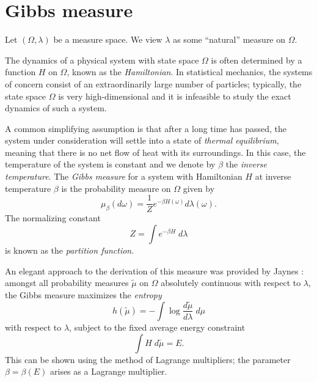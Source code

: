
\section{Gibbs measure}

Let $(\Omega, \lambda)$ be a measure space. We view $\lambda$ as some ``natural''
measure on $\Omega$.

The dynamics of a physical system with state space $\Omega$
is often determined by a function $H$ on $\Omega$, known as the \emph{Hamiltonian}.
In statistical mechanics, the systems of concern consist of an extraordinarily
large number of particles; typically, the state space $\Omega$ is very
high-dimensional and it is infeasible to study the exact dynamics of such a
system.

A common simplifying assumption is that after a long time has passed, the system
under consideration will settle into a state of \emph{thermal equilibrium}, meaning
that there is no net flow of heat with its surroundings. In this case, the temperature
of the system is constant and we denote by $\beta$ the \emph{inverse temperature}.
The \emph{Gibbs measure} for a system with Hamiltonian $H$ at inverse temperature
$\beta$ is the probability measure on $\Omega$ given by
\begin{equation}
\label{e:gibbs-def}
\mu_\beta(d\omega) = \frac{1}{Z} e^{-\beta H(\omega)} d\lambda(\omega).
\end{equation}
The normalizing constant
\begin{equation}
Z = \int e^{-\beta H} \; d\lambda
\end{equation}
is known as the \emph{partition function}.

An elegant approach to the derivation of this measure was provided by Jaynes
\cite{Jaynes57}: amongst all probability measures $\tilde\mu$ on $\Omega$ absolutely
continuous with respect to $\lambda$, the Gibbs measure maximizes the \emph{entropy}
\begin{equation}
\label{e:entropy-def}
h(\tilde\mu) = -\int \log \frac{d\tilde\mu}{d\lambda} \; d\mu
\end{equation}
with respect to $\lambda$, subject to the fixed average energy constraint
\begin{equation}
\int H \; d\tilde\mu = E.
\end{equation}
This can be shown using the method of Lagrange multipliers; the parameter
$\beta = \beta(E)$ arises as a Lagrange multiplier.

